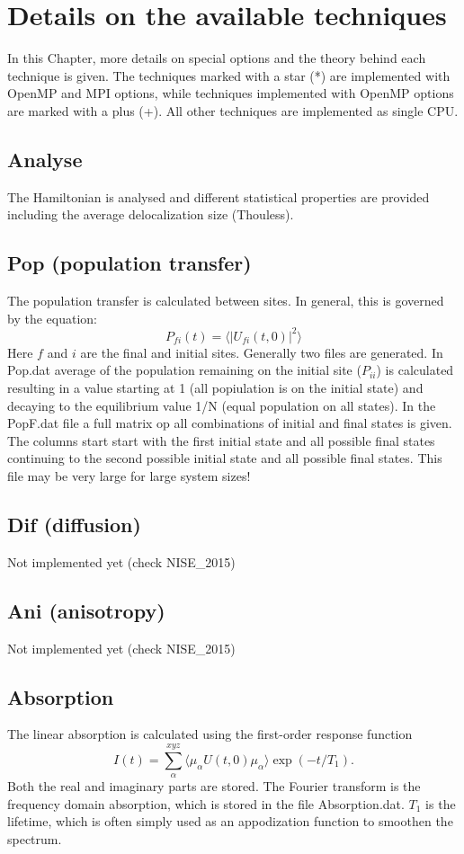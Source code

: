 \chapter{\label{chap:techniques}Details on the available techniques}
In this Chapter, more details on special options and the theory behind each technique is given. The techniques marked with a star (*) are implemented with OpenMP and MPI options, while techniques implemented with OpenMP options are marked with a plus (+). All other techniques are implemented as single CPU. 
\section{Analyse}
The Hamiltonian is analysed and different statistical properties are provided including the average delocalization size (Thouless).
\section{Pop (population transfer)}
The population transfer is calculated between sites. In general, this is governed by the equation:
\begin{equation}
P_{fi}(t)=\langle |U_{fi}(t,0)|^2 \rangle
\end{equation}
Here $f$ and $i$ are the final and initial sites. Generally two files are generated. In Pop.dat average of the population remaining on the initial site ($P_{ii}$) is calculated resulting in a value starting at 1 (all popiulation is on the initial state) and decaying to the equilibrium value 1/N (equal population on all states). In the PopF.dat file a full matrix op all combinations of initial and final states is given. The columns start start with the first initial state and all possible final states continuing to the second possible initial state and all possible final states. This file may be very large for large system sizes!
\section{Dif (diffusion)}
Not implemented yet (check NISE\_2015)
\section{Ani (anisotropy)}
Not implemented yet (check NISE\_2015)
\section{Absorption}
The linear absorption is calculated using the first-order response function
\begin{equation}
I(t)=\sum_{\alpha}^{xyz}\langle\mu_{\alpha}U(t,0)\mu_{\alpha}\rangle\exp(-t/T_1).
\end{equation}
Both the real and imaginary parts are stored. The Fourier transform is the frequency domain absorption, which is stored in the file Absorption.dat. $T_1$ is the lifetime, which is often simply used as an appodization function to smoothen the spectrum. 
